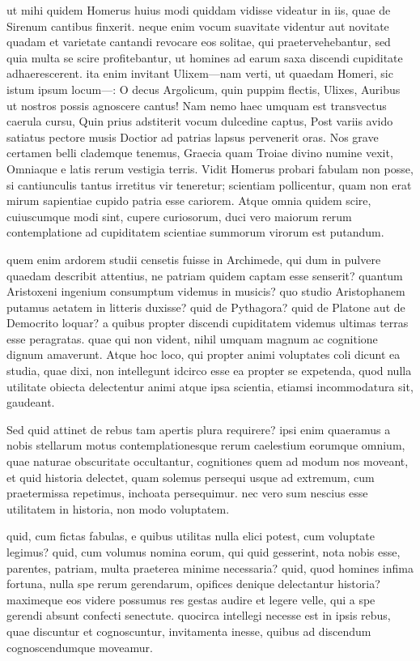  ut mihi quidem Homerus huius modi quiddam vidisse videatur in iis, quae de Sirenum cantibus finxerit. neque enim vocum suavitate videntur aut novitate quadam et varietate cantandi revocare eos solitae, qui praetervehebantur, sed quia multa se scire profitebantur, ut homines ad earum saxa discendi cupiditate adhaerescerent. ita enim invitant Ulixem—nam verti, ut quaedam Homeri, sic istum ipsum locum—: O decus Argolicum, quin puppim flectis, Ulixes, Auribus ut nostros possis agnoscere cantus! Nam nemo haec umquam est transvectus caerula cursu, Quin prius adstiterit vocum dulcedine captus, Post variis avido satiatus pectore musis Doctior ad patrias lapsus pervenerit oras. Nos grave certamen belli clademque tenemus, Graecia quam Troiae divino numine vexit, Omniaque e latis rerum vestigia terris. Vidit Homerus probari fabulam non posse, si cantiunculis tantus irretitus vir teneretur; scientiam pollicentur, quam non erat mirum sapientiae cupido patria esse cariorem. Atque omnia quidem scire, cuiuscumque modi sint, cupere curiosorum, duci vero maiorum rerum contemplatione ad cupiditatem scientiae summorum virorum est putandum.

 quem enim ardorem studii censetis fuisse in Archimede, qui dum in pulvere quaedam describit attentius, ne patriam quidem captam esse senserit? quantum Aristoxeni ingenium consumptum videmus in musicis? quo studio Aristophanem putamus aetatem in litteris duxisse? quid de Pythagora? quid de Platone aut de Democrito loquar? a quibus propter discendi cupiditatem videmus ultimas terras esse peragratas. quae qui non vident, nihil umquam magnum ac cognitione dignum amaverunt. Atque hoc loco, qui propter animi voluptates coli dicunt ea studia, quae dixi, non intellegunt idcirco esse ea propter se expetenda, quod nulla utilitate obiecta delectentur animi atque ipsa scientia, etiamsi incommodatura sit, gaudeant.

 Sed quid attinet de rebus tam apertis plura requirere? ipsi enim quaeramus a nobis stellarum motus contemplationesque rerum caelestium eorumque omnium, quae naturae obscuritate occultantur, cognitiones quem ad modum nos moveant, et quid historia delectet, quam solemus persequi usque ad extremum, cum praetermissa repetimus, inchoata persequimur. nec vero sum nescius esse utilitatem in historia, non modo voluptatem.

 quid, cum fictas fabulas, e quibus utilitas nulla elici potest, cum voluptate legimus? quid, cum volumus nomina eorum, qui quid gesserint, nota nobis esse, parentes, patriam, multa praeterea minime necessaria? quid, quod homines infima fortuna, nulla spe rerum gerendarum, opifices denique delectantur historia? maximeque eos videre possumus res gestas audire et legere velle, qui a spe gerendi absunt confecti senectute. quocirca intellegi necesse est in ipsis rebus, quae discuntur et cognoscuntur, invitamenta inesse, quibus ad discendum cognoscendumque moveamur.

